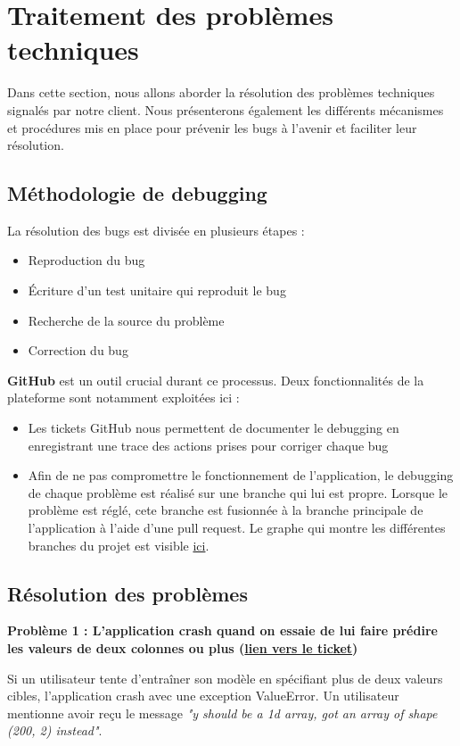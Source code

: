 \documentclass[french]{article}
\begin{document}
    \section{Traitement des problèmes techniques}
    Dans cette section, nous allons aborder la résolution des problèmes techniques signalés par notre client. Nous présenterons également les différents mécanismes et procédures mis en place pour prévenir les bugs à l'avenir et faciliter leur résolution.
    \subsection{Méthodologie de debugging}
    La résolution des bugs est divisée en plusieurs étapes :
    \begin{itemize}
        \item Reproduction du bug
        \item Écriture d'un test unitaire qui reproduit le bug
        \item Recherche de la source du problème
        \item Correction du bug
    \end{itemize}
    \textbf{GitHub} est un outil crucial durant ce processus. Deux fonctionnalités de la plateforme sont notamment exploitées ici :
    \begin{itemize}
        \item Les tickets GitHub nous permettent de documenter le debugging en enregistrant une trace des actions prises pour corriger chaque bug
        \item Afin de ne pas compromettre le fonctionnement de l'application, le debugging de chaque problème est réalisé sur une branche qui lui est propre. Lorsque le problème est réglé, cete branche est fusionnée à la branche principale de l'application à l'aide d'une pull request. Le graphe qui montre les différentes branches du projet est visible \href{https://github.com/vinpap/mathfinder/network}{ici}.
    \end{itemize}
    \subsection{Résolution des problèmes}
    \textbf{Problème 1 : L'application crash quand on essaie de lui faire prédire les valeurs de deux colonnes ou plus (\href{https://github.com/vinpap/mathfinder/issues/2}{lien vers le ticket})}

    Si un utilisateur tente d'entraîner son modèle en spécifiant plus de deux valeurs cibles, l'application crash avec une exception ValueError. Un utilisateur mentionne avoir reçu le message \textit{"y should be a 1d array, got an array of shape (200, 2) instead"}.
\end{document}
